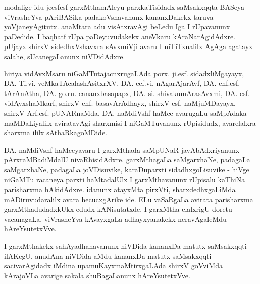 modalige idu jeesfesf garxMthamAleyu parxkaTisidadx saMsakxqqta BASeya viVrasheYva pAriBASika padakoVshavanunx kananxDakekx taruva yoVjaneyAgitutx. anaMtara adu visAtxravAgi beLedu Iga I rUpavanunx paDedide. I baqhatf rUpa paDeyuvudakekx aneVkaru kAraNarAgidAdxre. pUjayx shirxV sidedhxVshavxra sAvxmiVji avaru I niTiTxnalilx AgAga agatayx salahe, sUcanegaLanunx niVDidAdxre.

hiriya vidAvxMsaru niGaMTutajacnxrugaLAda porx. ji.esf. sidadxliMgayayx, DA. Ti.vi. veMkaTAcalashAsitxrXV, DA. ecf.vi. nAgarAja\-rAvf, DA. enf.esf. tArAnAtha, DA. go.ru. cananxbasapapx, DA. si. shivakumArasAvxmi, DA. esf. vidAyxshaMkarf, shirxV enf. basavArAdhayx, shirxV esf. naMjuMDayayx, shirxV Arf.esf. pUNARnaMda, DA. naMdiVshf haMce avarugaLu saMpAdaka maMDaLiyalilx aviratavAgi sharxmisi I niGaMTuvanunx rUpisidudx, avarelalxra sharxma ililx sAthaRkagoMDide.

DA. naMdiVshf haMceyavaru I garxMthada saMpUNaR javAbAdxriyanunx pArxraMBadiMdalU nivaRhisidAdxre. garxMthagaLa saMgarxhaNe, padagaLa saMgarxhaNe, padagaLa joVDisuvike, karaDuparxti sidadhxgoLisuvike - hiVge niGaMTu racaneya parxti haMtadalUlx I garxMthavanunx rUpisalu kaThiNa parisharxma hAkidAdxre. idanunx atayxMta pirxVti, sharxdedhxgaLiMda mADiruvudaralilx avara hecucxgArike ide. ELu vaSaRgaLa avirata parisharxma garxMthadudadxkUkx edudx kANisutatxde. I garxMtha elalxrigU doretu vacanagaLa, viVrasheYva kAvayxgaLa adhayxyanakekx neravAgaleMdu hAreYsutetxVve. 

I garxMthakekx sahAyadhanavanunx niVDida kananxDa matutx saMsakxqqti ilAKegU, anudAna niVDida aMdu kananxDa matutx saMsakxqqti saciva\-rAgidadx iMdina upamuKayxmaMtirxgaLAda shirxV goVviMda kArajoVLa avarige sakala shuBagaLanunx hAreYsutetxVve. 
